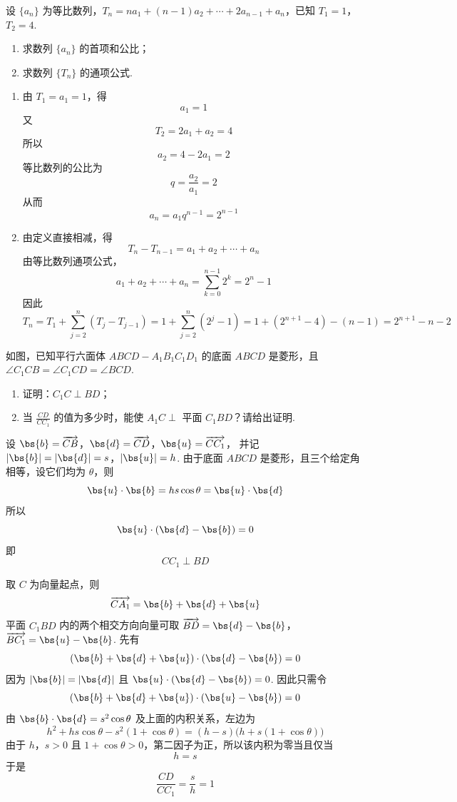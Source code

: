 \begin{problem}
设 \(\{a_{n}\}\) 为等比数列，\(T_{n} = na_{1} + (n - 1)a_{2} + \cdots + 2a_{n-1} + a_{n}\)，已知 \(T_{1} = 1\)，\(T_{2} = 4\).

\begin{enumerate}
\item 求数列 \(\{a_{n}\}\) 的首项和公比；
\item 求数列 \(\{T_{n}\}\) 的通项公式.
\end{enumerate}
\end{problem}

\begin{solution}
\begin{enumerate}
\item 由 \(T_1=a_1=1\)，得
\[
a_1=1
\]
又
\[
T_2=2a_1+a_2=4
\]
所以
\[
a_2=4-2a_1=2
\]
等比数列的公比为
\[
q=\frac{a_2}{a_1}=2
\]
从而
\[
a_n=a_1q^{n-1}=2^{n-1}
\]
\item 由定义直接相减，得
\[
T_n-T_{n-1}=a_1+a_2+\cdots+a_n
\]
由等比数列通项公式，
\[
a_1+a_2+\cdots+a_n=\sum_{k=0}^{n-1}2^k=2^n-1
\]
因此
\[
T_n=T_1+\sum_{j=2}^{n}(T_j-T_{j-1})
=1+\sum_{j=2}^{n}(2^j-1)
=1+(2^{n+1}-4)-(n-1)
=2^{n+1}-n-2
\]
\end{enumerate}
\end{solution}

\begin{problem}
如图，已知平行六面体 \(ABCD - A_{1}B_{1}C_{1}D_{1}\) 的底面 \(ABCD\) 是菱形，且 \(\angle C_{1}CB = \angle C_{1}CD = \angle BCD\).

\begin{enumerate}
\item 证明：\(C_{1}C \perp BD\)；
\item 当 \(\frac{CD}{CC_{1}}\) 的值为多少时，能使 \(A_{1}C \perp\) 平面 \(C_{1}BD\)？请给出证明.
\end{enumerate}

\end{problem}

\begin{solution}
设
\(\bs{b}=\overrightarrow{CB}\)，\(\bs{d}=\overrightarrow{CD}\)，\(\bs{u}=\overrightarrow{CC_1}\)，
并记
\(|\bs{b}|=|\bs{d}|=s\)，\(|\bs{u}|=h\).
由于底面 \(ABCD\) 是菱形，且三个给定角相等，设它们均为 \(\theta\)，则
\[
\bs{u}\cdot\bs{b}=hs\cos\theta
=\bs{u}\cdot\bs{d}
\]
所以
\[
\bs{u}\cdot(\bs{d}-\bs{b})=0
\]
即
\[
CC_1\perp BD
\]

取 \(C\) 为向量起点，则
\[
\overrightarrow{CA_1}=\bs{b}+\bs{d}+\bs{u}
\]
平面 \(C_1BD\) 内的两个相交方向向量可取
\(\overrightarrow{BD}=\bs{d}-\bs{b}\)，\(\overrightarrow{BC_1}=\bs{u}-\bs{b}\).
先有
\[
(\bs{b}+\bs{d}+\bs{u})\cdot(\bs{d}-\bs{b})=0
\]
因为 \(|\bs{b}|=|\bs{d}|\) 且 \(\bs{u}\cdot(\bs{d}-\bs{b})=0\). 因此只需令
\[
(\bs{b}+\bs{d}+\bs{u})\cdot(\bs{u}-\bs{b})=0
\]
由 \(\bs{b}\cdot\bs{d}=s^2\cos\theta\) 及上面的内积关系，左边为
\[
h^2+hs\cos\theta-s^2(1+\cos\theta)
=(h-s)\bigl(h+s(1+\cos\theta)\bigr)
\]
由于 \(h\)，\(s>0\) 且 \(1+\cos\theta>0\)，第二因子为正，所以该内积为零当且仅当
\[
h=s
\]
于是
\[
\frac{CD}{CC_1}=\frac{s}{h}=1
\]
\end{solution}

